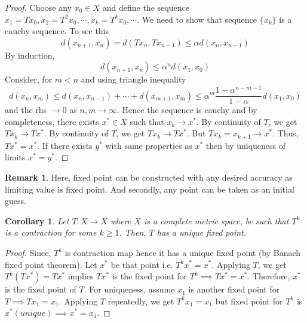 \documentclass[12pt,reqno]{amsart}
\theoremstyle{plain}
\newtheorem{cor}{Corollary}
\theoremstyle{definition}
\newtheorem{rem}{Remark}
\begin{document}
\begin{proof}
    Choose any $x_0 \in X$ and define the sequence $x_1 = Tx_0, x_2 = T^2x_0, \cdots, x_k = T^kx_0, \cdots.$ We need to show that sequence $\{x_k\}$ is a cauchy sequence. To see this
    $$ d(x_{n+1}, x_n) = d(Tx_n, Tx_{n-1}) \leq \alpha  d(x_n, x_{n-1})$$
    By induction, 
    $$ d(x_{n+1}, x_n) \leq \alpha^n d(x_1, x_0)$$
    Consider, for $m < n$ and using triangle inequality
    $$ d(x_n, x_m) \leq d(x_n, x_{n-1}) + \cdots + d(x_{m+1}, x_m) \leq \alpha^m \frac{1-\alpha^{n-m-1}}{1-\alpha} d(x_1, x_0)$$
    and the rhs $\to 0$ as $n,m \to \infty$. Hence the sequence is cauchy and by completeness, there exists $x^* \in X$ such that $x_k \to x^*$. By  continuity of $T$, we get $Tx_k \to Tx^*$. By continuity of $T$, we get $Tx_k \to Tx^*$. But $Tx_k = x_{k+1} \to x^*$. Thus, $Tx^* = x^*$. If there exists $y^*$ with same properties as $x^*$ then by uniqueness of limits $x^* = y^*$. 
\end{proof}
\begin{rem}
    Here, fixed point can be constructed with any desired accuracy as limiting value is fixed point. And secondly, any point can be taken as an initial guess.
\end{rem}

\begin{cor}
    Let $T \colon X \to X$ where $X$ is a complete metric space, be such that $T^k$ is a contraction for some $k \geq 1$. Then, $T$ has a unique fixed point.
\end{cor}
\begin{proof}
    Since, $T^k$ is contraction map hence it has a unique fixed point (by Banach fixed point theorem). Let $x^*$ be that point i.e. $T^kx^* = x^*$. Applying $T$, we get $T^k (Tx^*) = Tx^*$ implies $Tx^*$ is the fixed point for $T^k \implies Tx^* = x^*$. Therefore, $x^*$ is the fixed point of $T$. For uniqueness, assume $x_1$ is another fixed point for $T \implies Tx_1 = x_1$. Applying $T$ repeatedly, we get $T^kx_1 = x_1$ but fixed point for $T^k$ is $x^*(unique) \implies x^* = x_1$.
\end{proof}
\end{document}
